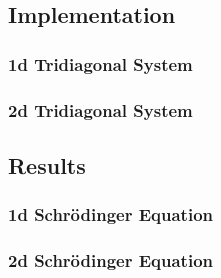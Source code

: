 \documentclass[10pt]{article}
\begin{document}
\subsection*{Implementation}

\subsubsection*{1d Tridiagonal System}


\subsubsection*{2d Tridiagonal System}


\subsection*{Results}

\subsubsection*{1d Schrödinger Equation}



\subsubsection*{2d Schrödinger Equation}




\end{document}

